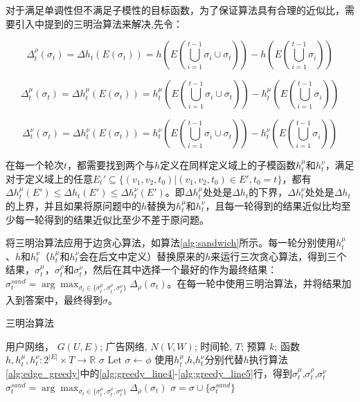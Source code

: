 对于满足单调性但不满足子模性的目标函数，为了保证算法具有合理的近似比，需要引入\parencite{sandwich}中提到的三明治算法来解决,先令：

\begin{equation}
\Delta_t^\rho(\sigma_t)=\Delta h_t(E(\sigma_t))=h(E(\bigcup_{i=1}^{t-1}{\sigma_i} \cup \sigma_t)) - h(E(\bigcup_{i=1}^{t-1}{\sigma_i}))
\end{equation}

\begin{equation}
\Delta_t^\mu(\sigma_t)=\Delta h_t^\mu(E(\sigma_t))=h_t^\mu(E(\bigcup_{i=1}^{t-1}{\sigma_i} \cup \sigma_t)) - h_t^\mu(E(\bigcup_{i=1}^{t-1}{\sigma_i}))
\end{equation}

\begin{equation}
\Delta_t^\nu(\sigma_t)=\Delta h_t^\nu(E(\sigma_t))=h_t^\nu(E(\bigcup_{i=1}^{t-1}{\sigma_i} \cup \sigma_t)) - h_t^\nu(E(\bigcup_{i=1}^{t-1}{\sigma_i}))
\end{equation}

在每一个轮次$t$，都需要找到两个与$h$定义在同样定义域上的子模函数$h_t^\mu$和$h_t^\nu$，满足对于定义域上的任意$E_t' \subseteq \{(v_1,v_2,t_0)|(v_1,v_2,t_0)\in E',t_0=t\}$，都有$\Delta h_t^\mu(E') \le \Delta h_t(E') \le \Delta h_t^\nu(E')$。即$\Delta h_t^\mu$处处是$\Delta h_t$的下界，$\Delta h_t^\nu$处处是$\Delta h_t$的上界，并且如果将原问题中的$h$替换为$h_t^\mu$和$h_t^\nu$，且每一轮得到的结果近似比均至少每一轮得到的结果近似比至少不差于原问题。

将三明治算法应用于边贪心算法，如算法\ref{alg:sandwich}所示。每一轮分别使用$h_t^\mu$、$h$和$h_t^\nu$（$h_t^\mu$和$h_t^\nu$会在后文中定义）替换原来的$h$来运行三次贪心算法，得到三个结果，$\sigma_t^\mu$，$\sigma_t^\rho$和$\sigma_t^\nu$，然后在其中选择一个最好的作为最终结果：$\sigma_t^{sand}=\arg\max_{\sigma_t \in \{\sigma_t^\mu,\sigma_t^\rho,\sigma_t^\nu\}}\Delta_\rho(\sigma_t)$。在每一轮中使用三明治算法，并将结果加入到答案中，最终得到$\sigma$。

\begin{algorithm}
    \caption{三明治算法\label{alg:sandwich}} 
    \begin{algorithmic}[1]
        \REQUIRE 用户网络， $G(U,E)$; 广告网络, $N(V,W)$; 时间轮, $T$; 预算 $k$; 函数 $h,h_t^\mu,h_t^\nu:2^{|E|} \times T \to \mathbb{R} $
        \ENSURE $\sigma$
        \STATE Let $\sigma \gets \phi$
            \STATE 使用$h_t^\mu$,$h$,$h_t^\nu$分别代替$h$执行算法\ref{alg:edge_greedy}中的\ref{alg:greedy_line4}-\ref{alg:greedy_line5}行，得到$\sigma_t^\mu$,$\sigma_t^\rho$,$\sigma_t^\nu$
            \STATE $\sigma_t^{sand}=\arg\max_{\sigma_t \in \{\sigma_t^\mu,\sigma_t^\rho,\sigma_t^\nu\}}\Delta_\rho(\sigma_t)$
            \STATE $\sigma = \sigma \cup \{\sigma_t^{sand}\}$
        \ENDFOR
    \end{algorithmic}
\end{algorithm}

